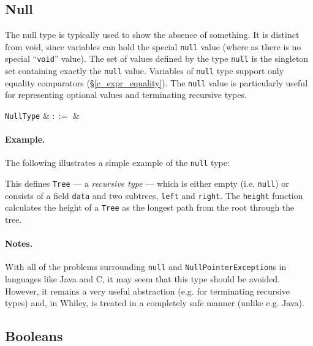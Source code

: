 \subsection{Null}
\label{c_types_null}

The null type is typically used to show the absence of something. It is distinct from void, since variables can hold the special \lstinline{null} value (where as there is no special ``\lstinline{void}'' value).  The set of values defined by the type \lstinline{null} is the singleton set containing exactly the \lstinline{null} value.  Variables of \lstinline{null} type support only equality comparators (\S\ref{c_expr_equality}).  The \lstinline{null} value is particularly useful for representing optional values and terminating recursive types.

\begin{syntax}
  \verb+NullType+ & $::=$ &  \\
\end{syntax}

\paragraph{Example.} The following illustrates a simple example of the \lstinline{null} type:



This defines \lstinline{Tree} --- a {\em recursive type} --- which is either empty (i.e. \lstinline{null}) or consists of a field \lstinline{data} and two subtrees, \lstinline{left} and \lstinline{right}.  The \lstinline{height} function calculates the height of a \lstinline{Tree} as the longest path from the root through the tree.

\paragraph{Notes.}  With all of the problems surrounding \lstinline{null} and \lstinline{NullPointerException}s in languages like Java and C, it may seem that this type should be avoided. However, it remains a very useful abstraction (e.g. for terminating recursive types) and, in Whiley, is treated in a completely safe manner (unlike e.g. Java).


\subsection{Booleans}
\label{c_types_bool}

